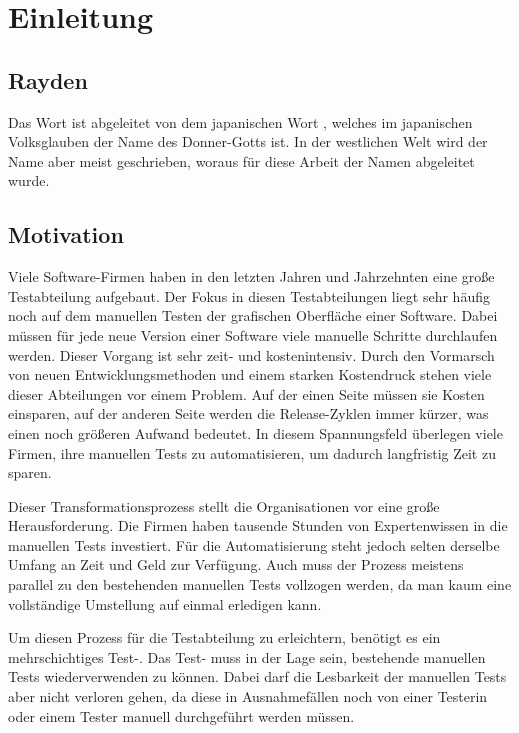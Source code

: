 \chapter{Einleitung}
\label{cha:Einleitung}

\section{Rayden}

Das Wort  ist abgeleitet von dem japanischen Wort , welches im japanischen Volksglauben der Name des Donner-Gotts ist. In der westlichen Welt wird der Name aber meist  geschrieben, woraus für diese Arbeit der Namen  abgeleitet wurde.


\section{Motivation}

Viele Software-Firmen haben in den letzten Jahren und Jahrzehnten eine große Testabteilung aufgebaut. Der Fokus in diesen Testabteilungen liegt sehr häufig noch auf dem manuellen Testen der grafischen Oberfläche einer Software. Dabei müssen für jede neue Version einer Software viele manuelle Schritte durchlaufen werden. Dieser Vorgang ist sehr zeit- und kostenintensiv. Durch den Vormarsch von neuen Entwicklungsmethoden und einem starken Kostendruck stehen viele dieser Abteilungen vor einem Problem. Auf der einen Seite müssen sie Kosten einsparen, auf der anderen Seite werden die Release-Zyklen immer kürzer, was einen noch größeren Aufwand bedeutet. In diesem Spannungsfeld überlegen viele Firmen, ihre manuellen Tests zu automatisieren, um dadurch langfristig Zeit zu sparen. 

\SuperPar
Dieser Transformationsprozess stellt die Organisationen vor eine große Herausforderung. Die Firmen haben tausende Stunden von Expertenwissen in die manuellen Tests investiert. Für die Automatisierung steht jedoch selten derselbe Umfang an Zeit und Geld zur Verfügung. Auch muss der Prozess meistens parallel zu den bestehenden manuellen Tests vollzogen werden, da man kaum eine vollständige Umstellung auf einmal erledigen kann.

\SuperPar
Um diesen Prozess für die Testabteilung zu erleichtern, benötigt es ein mehrschichtiges Test-. Das Test- muss in der Lage sein, bestehende manuellen Tests wiederverwenden zu können. Dabei darf die Lesbarkeit der manuellen Tests aber nicht verloren gehen, da diese in Ausnahmefällen noch von einer Testerin oder einem Tester manuell durchgeführt werden müssen.

